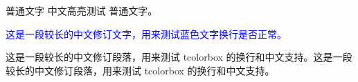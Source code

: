 \documentclass{ctexart}
\newcommand{\rev}[1]{\textcolor{blue}{#1}}
\newcommand{\revhl}[1]{\colorbox{yellow!30}{#1}}
\begin{document}
普通文字 \revhl{中文高亮测试} 普通文字。

\rev{这是一段较长的中文修订文字，用来测试蓝色文字换行是否正常。}

\begin{revbox}
这是一段较长的中文修订段落，用来测试 tcolorbox 的换行和中文支持。这是一段较长的中文修订段落，用来测试 tcolorbox 的换行和中文支持。
\end{revbox}
\end{document}
